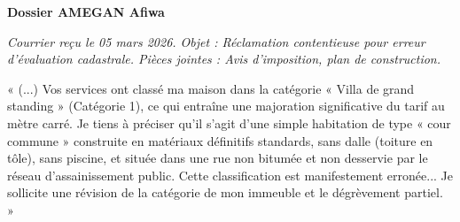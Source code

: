 \documentclass[a4paper, 11pt]{exam}
\begin{document}
\begin{questions}
		\vspace{0.5cm}
		
		\question \textbf{Dossier AMEGAN Afiwa}
		
		\textit{Courrier reçu le 05 mars 2026. Objet : Réclamation contentieuse pour erreur d'évaluation cadastrale. Pièces jointes : Avis d'imposition, plan de construction.}
		
		« (...) Vos services ont classé ma maison dans la catégorie « Villa de grand standing » (Catégorie 1), ce qui entraîne une majoration significative du tarif au mètre carré. Je tiens à préciser qu'il s'agit d'une simple habitation de type « cour commune » construite en matériaux définitifs standards, sans dalle (toiture en tôle), sans piscine, et située dans une rue non bitumée et non desservie par le réseau d'assainissement public. Cette classification est manifestement erronée... Je sollicite une révision de la catégorie de mon immeuble et le dégrèvement partiel. »
		
		
		\vspace{0.5cm}
		

\end{questions}
\end{document}
